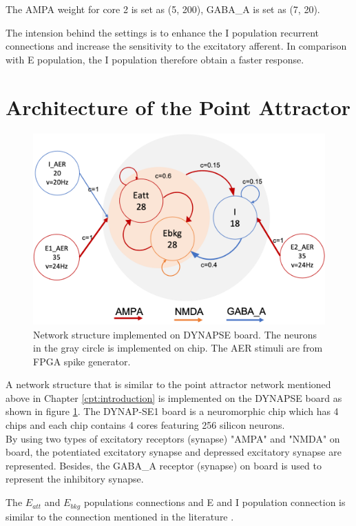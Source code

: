 The AMPA weight for core 2 is set as (5, 200), GABA\_A is set as (7, 20). 

The intension behind the settings is to enhance the I population recurrent connections and increase the sensitivity to the excitatory afferent. In comparison with E population, the I population therefore obtain a faster response.

\section{Architecture of the Point Attractor}
\begin{figure}
	\centering
	\includegraphics[width=\columnwidth]{./img/implementation/network_structure.png}
	\caption{Network structure implemented on DYNAPSE board. The neurons in the gray circle is implemented on chip. The AER stimuli are from FPGA spike generator. }
	\label{fig:NNstructure}
\end{figure}

A network structure that is similar to the point attractor network mentioned above in Chapter \ref{cpt:introduction} is implemented on the DYNAPSE board as shown in figure \ref{fig:NNstructure}. The DYNAP-SE1 board is a neuromorphic chip which has 4 chips and each chip contains 4 cores featuring 256 silicon neurons.\\

By using two types of excitatory receptors (synapse) "AMPA" and "NMDA" on board, the potentiated excitatory synapse and depressed excitatory synapse are represented. 
Besides, the GABA\_A receptor (synapse) on board is used to represent the inhibitory synapse.

The $E_{att}$ and $E_{bkg}$ populations connections and E and I population connection is similar to the connection mentioned in the literature \cite{giudiceRobustWorkingMemory2012}.\\

